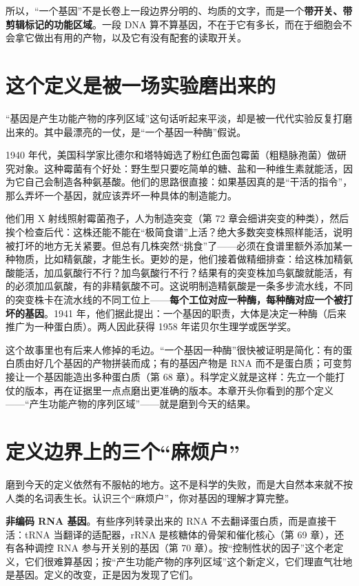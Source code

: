 所以，“一个基因”不是长卷上一段边界分明的、均质的文字，而是一个\textbf{带开关、带剪辑标记的功能区域}。一段 DNA 算不算基因，不在于它有多长，而在于细胞会不会拿它做出有用的产物，以及它有没有配套的读取开关。

\section{这个定义是被一场实验磨出来的}

“基因是产生功能产物的序列区域”这句话听起来平淡，却是被一代代实验反复打磨出来的。其中最漂亮的一仗，是“一个基因一种酶”假说。

\begin{zhengju}
1940 年代，美国科学家比德尔和塔特姆选了粉红色面包霉菌（粗糙脉孢菌）做研究对象。这种霉菌有个好处：野生型只要吃简单的糖、盐和一种维生素就能活，因为它自己会制造各种氨基酸。他们的思路很直接：如果基因真的是“干活的指令”，那么弄坏一个基因，就应该弄坏一种具体的制造能力。

他们用 X 射线照射霉菌孢子，人为制造突变（第 72 章会细讲突变的种类），然后挨个检查后代：这株还能不能在“极简食谱”上活？绝大多数突变株照样能活，说明被打坏的地方无关紧要。但总有几株突然“挑食”了——必须在食谱里额外添加某一种物质，比如精氨酸，才能生长。更妙的是，他们接着做精细排查：给这株加精氨酸能活，加瓜氨酸行不行？加鸟氨酸行不行？结果有的突变株加鸟氨酸就能活，有的必须加瓜氨酸，有的非精氨酸不可。这说明制造精氨酸是一条多步流水线，不同的突变株卡在流水线的不同工位上——\textbf{每个工位对应一种酶，每种酶对应一个被打坏的基因}。1941 年，他们据此提出：一个基因的职责，大体是决定一种酶（后来推广为一种蛋白质）。两人因此获得 1958 年诺贝尔生理学或医学奖。

这个故事里也有后来人修掉的毛边。“一个基因一种酶”很快被证明是简化：有的蛋白质由好几个基因的产物拼装而成；有的基因产物是 RNA 而不是蛋白质；可变剪接让一个基因能造出多种蛋白质（第 68 章）。科学定义就是这样：先立一个能打仗的版本，再在证据里一点点磨出更准确的版本。本章开头你看到的那个定义——“产生功能产物的序列区域”——就是磨到今天的结果。
\end{zhengju}

\section{定义边界上的三个“麻烦户”}

磨到今天的定义依然有不服帖的地方。这不是科学的失败，而是大自然本来就不按人类的名词表生长。认识三个“麻烦户”，你对基因的理解才算完整。

\textbf{非编码 RNA 基因}。有些序列转录出来的 RNA 不去翻译蛋白质，而是直接干活：tRNA 当翻译的适配器，rRNA 是核糖体的骨架和催化核心（第 69 章），还有各种调控 RNA 参与开关别的基因（第 70 章）。按“控制性状的因子”这个老定义，它们很难算基因；按“产生功能产物的序列区域”这个新定义，它们理直气壮地是基因。定义的改变，正是因为发现了它们。

